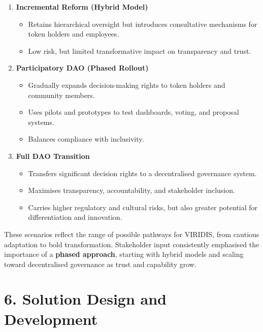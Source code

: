 \documentclass[
  english,
  12pt,
  oneside,
  open=any]{scrbook}
\providecommand{\tightlist}{%
  \setlength{\itemsep}{0pt}\setlength{\parskip}{0pt}}\usepackage{longtable,booktabs,array}
\begin{document}
\begin{enumerate}
\def\labelenumi{\arabic{enumi}.}
\tightlist
\item
  \textbf{Incremental Reform (Hybrid Model)}

  \begin{itemize}
  \tightlist
  \item
    Retains hierarchical oversight but introduces consultative
    mechanisms for token holders and employees.\\
  \item
    Low risk, but limited transformative impact on transparency and
    trust.
  \end{itemize}
\item
  \textbf{Participatory DAO (Phased Rollout)}

  \begin{itemize}
  \tightlist
  \item
    Gradually expands decision-making rights to token holders and
    community members.\\
  \item
    Uses pilots and prototypes to test dashboards, voting, and proposal
    systems.\\
  \item
    Balances compliance with inclusivity.
  \end{itemize}
\item
  \textbf{Full DAO Transition}

  \begin{itemize}
  \tightlist
  \item
    Transfers significant decision rights to a decentralised governance
    system.\\
  \item
    Maximises transparency, accountability, and stakeholder inclusion.\\
  \item
    Carries higher regulatory and cultural risks, but also greater
    potential for differentiation and innovation.
  \end{itemize}
\end{enumerate}

These scenarios reflect the range of possible pathways for VIRIDIS, from
cautious adaptation to bold transformation. Stakeholder input
consistently emphasised the importance of a \textbf{phased approach},
starting with hybrid models and scaling toward decentralised governance
as trust and capability grow.

\chapter{6. Solution Design and Development}\label{sec-solution}
\end{document}
